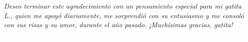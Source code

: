 \begin{acknowledgements}
\vfill{}

%
%
    \emph{Deseo terminar este agradecimiento con un pensamiento especial para mi gatita \emph{L.}, quien me apoyó diariamente, me sorprendió con su entusiasmo y me consoló con sus risas y su amor, durante el año pasado. ¡Muchísimas gracias, gatita!}
    \textcolor{white}{$\heartsuit$ Te quiero, Lola, ¿quieres vivir conmigo?}

\end{acknowledgements}


